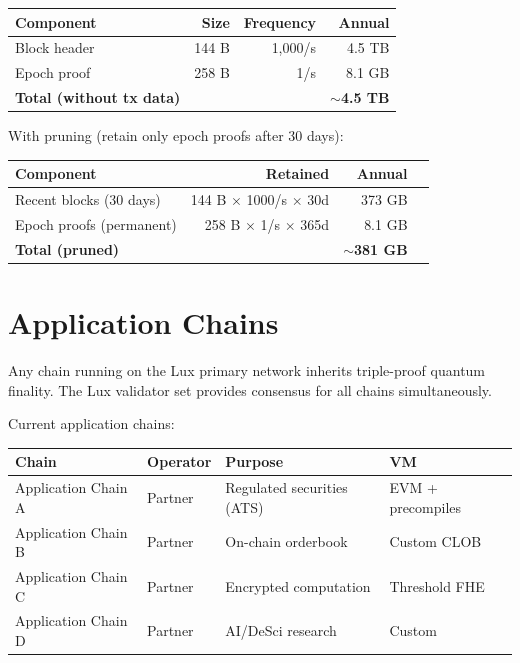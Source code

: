 \documentclass[11pt,a4paper]{article}
\begin{document}
\begin{center}
\begin{tabular}{lrrr}
\toprule
\textbf{Component} & \textbf{Size} & \textbf{Frequency} & \textbf{Annual} \\
\midrule
Block header & 144 B & 1,000/s & 4.5 TB \\
Epoch proof & 258 B & 1/s & 8.1 GB \\
\midrule
\textbf{Total (without tx data)} & & & \textbf{$\sim$4.5 TB} \\
\bottomrule
\end{tabular}
\end{center}

With pruning (retain only epoch proofs after 30 days):

\begin{center}
\begin{tabular}{lrrr}
\toprule
\textbf{Component} & \textbf{Retained} & \textbf{Annual} \\
\midrule
Recent blocks (30 days) & 144 B $\times$ 1000/s $\times$ 30d & 373 GB \\
Epoch proofs (permanent) & 258 B $\times$ 1/s $\times$ 365d & 8.1 GB \\
\midrule
\textbf{Total (pruned)} & & \textbf{$\sim$381 GB} \\
\bottomrule
\end{tabular}
\end{center}

\section{Application Chains}

Any chain running on the Lux primary network inherits triple-proof quantum finality. The Lux validator set provides consensus for all chains simultaneously.

Current application chains:

\begin{center}
\begin{tabular}{llll}
\toprule
\textbf{Chain} & \textbf{Operator} & \textbf{Purpose} & \textbf{VM} \\
\midrule
Application Chain A & Partner & Regulated securities (ATS) & EVM + precompiles \\
Application Chain B & Partner & On-chain orderbook & Custom CLOB \\
Application Chain C & Partner & Encrypted computation & Threshold FHE \\
Application Chain D & Partner & AI/DeSci research & Custom \\
\bottomrule
\end{tabular}
\end{center}
\end{document}
